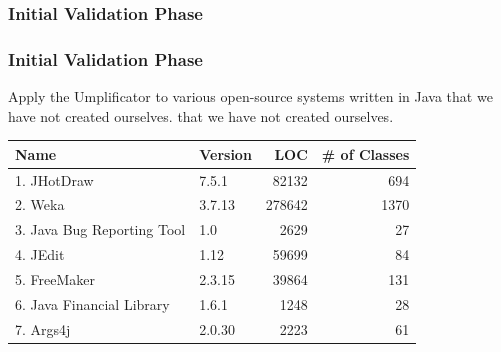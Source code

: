 \documentclass[xcolor=table]{beamer}
\begin{document}
\subsubsection{Initial Validation Phase} 
\begin{frame}[fragile] 
\frametitle{Initial Validation Phase}
Apply the Umplificator to various \textcolor{important}{\textcolor{important}{open-source systems written in Java} that we have not created ourselves.} that we have not created ourselves.

\begin{table}
\label{table:umplifiedSystems}
\centering
\begin{tabular}{l|lrr}
\toprule
\rowcolor[HTML]{BBDAFF}
\textbf{Name} & \textbf{Version} & \textbf{LOC} & \textbf{\# of Classes} \\ \midrule
 1. JHotDraw                   & 7.5.1   & 82132   & 694      \\ 
\hline 2.  Weka      & 3.7.13  & 278642  & 1370        \\ 
\hline  3. Java Bug Reporting Tool 		& 1.0     & 2629    & 27        \\ 
\hline  4. JEdit                  	& 1.12    & 59699   & 84         \\ 
\hline  5. FreeMaker               & 2.3.15  & 39864   & 131         \\ 
\hline  6. Java Financial Library  		& 1.6.1   & 1248    & 28          \\ 
\hline  7. Args4j               	 & 2.0.30  & 2223    & 61            \\
\bottomrule
\end{tabular}
\end{table}
\end{frame}
\end{document}
